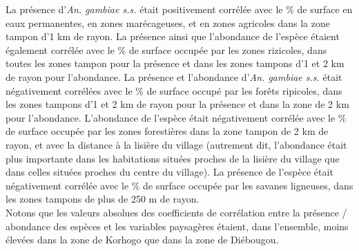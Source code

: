\documentclass[12pt,twoside]{reedthesis}
\begin{document}
La présence d'\emph{An. gambiae s.s.} était positivement corrélée avec le \% de surface en eaux permanentes, en zones marécageuses, et en zones agricoles dans la zone tampon d'1 km de rayon. La présence ainsi que l'abondance de l'espèce étaient également corrélée avec le \% de surface occupée par les zones rizicoles, dans toutes les zones tampon pour la présence et dans les zones tampons d'1 et 2 km de rayon pour l'abondance. La présence et l'abondance d'\emph{An. gambiae s.s.} était négativement corrélées avec le \% de surface occupé par les forêts ripicoles, dans les zones tampons d'1 et 2 km de rayon pour la présence et dans la zone de 2 km pour l'abondance. L'abondance de l'espèce était négativement corrélée avec le \% de surface occupée par les zones forestières dans la zone tampon de 2 km de rayon, et avec la distance à la lisière du village (autrement dit, l'abondance était plus importante dans les habitations situées proches de la lisière du village que dans celles situées proches du centre du village). La présence de l'espèce était négativement corrélée avec le \% de surface occupée par les savanes ligneuses, dans les zones tampons de plus de 250 m de rayon.\\

Notons que les valeurs absolues des coefficients de corrélation entre la présence / abondance des espèces et les variables paysagères étaient, dans l'ensemble, moins élevées dans la zone de Korhogo que dans la zone de Diébougou.\\
\end{document}
